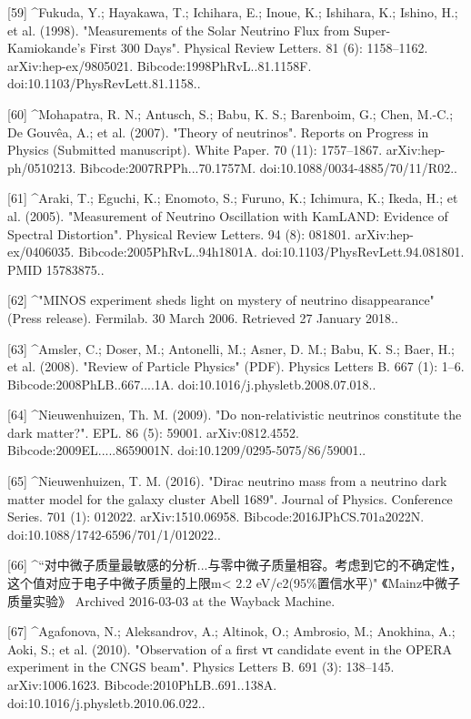 [59]
^Fukuda, Y.; Hayakawa, T.; Ichihara, E.; Inoue, K.; Ishihara, K.; Ishino, H.; et al. (1998). "Measurements of the Solar Neutrino Flux from Super-Kamiokande's First 300 Days". Physical Review Letters. 81 (6): 1158–1162. arXiv:hep-ex/9805021. Bibcode:1998PhRvL..81.1158F. doi:10.1103/PhysRevLett.81.1158..

[60]
^Mohapatra, R. N.; Antusch, S.; Babu, K. S.; Barenboim, G.; Chen, M.-C.; De Gouvêa, A.; et al. (2007). "Theory of neutrinos". Reports on Progress in Physics (Submitted manuscript). White Paper. 70 (11): 1757–1867. arXiv:hep-ph/0510213. Bibcode:2007RPPh...70.1757M. doi:10.1088/0034-4885/70/11/R02..

[61]
^Araki, T.; Eguchi, K.; Enomoto, S.; Furuno, K.; Ichimura, K.; Ikeda, H.; et al. (2005). "Measurement of Neutrino Oscillation with KamLAND: Evidence of Spectral Distortion". Physical Review Letters. 94 (8): 081801. arXiv:hep-ex/0406035. Bibcode:2005PhRvL..94h1801A. doi:10.1103/PhysRevLett.94.081801. PMID 15783875..

[62]
^"MINOS experiment sheds light on mystery of neutrino disappearance" (Press release). Fermilab. 30 March 2006. Retrieved 27 January 2018..

[63]
^Amsler, C.; Doser, M.; Antonelli, M.; Asner, D. M.; Babu, K. S.; Baer, H.; et al. (2008). "Review of Particle Physics" (PDF). Physics Letters B. 667 (1): 1–6. Bibcode:2008PhLB..667....1A. doi:10.1016/j.physletb.2008.07.018..

[64]
^Nieuwenhuizen, Th. M. (2009). "Do non-relativistic neutrinos constitute the dark matter?". EPL. 86 (5): 59001. arXiv:0812.4552. Bibcode:2009EL.....8659001N. doi:10.1209/0295-5075/86/59001..

[65]
^Nieuwenhuizen, T. M. (2016). "Dirac neutrino mass from a neutrino dark matter model for the galaxy cluster Abell 1689". Journal of Physics. Conference Series. 701 (1): 012022. arXiv:1510.06958. Bibcode:2016JPhCS.701a2022N. doi:10.1088/1742-6596/701/1/012022..

[66]
^“对中微子质量最敏感的分析...与零中微子质量相容。考虑到它的不确定性，这个值对应于电子中微子质量的上限m< 2.2 eV/c2(95\%置信水平)" 《Mainz中微子质量实验》 Archived 2016-03-03 at the Wayback Machine.

[67]
^Agafonova, N.; Aleksandrov, A.; Altinok, O.; Ambrosio, M.; Anokhina, A.; Aoki, S.; et al. (2010). "Observation of a first ντ candidate event in the OPERA experiment in the CNGS beam". Physics Letters B. 691 (3): 138–145. arXiv:1006.1623. Bibcode:2010PhLB..691..138A. doi:10.1016/j.physletb.2010.06.022..


